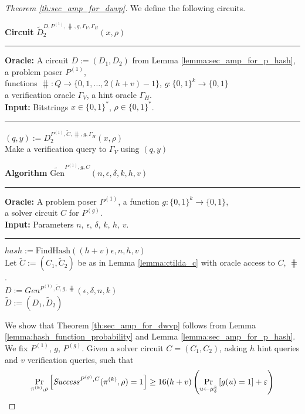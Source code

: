 %
\begin{proof}[Theorem \ref{th:sec_amp_for_dwvp}]
We define the following circuits.
%
\begin{codeblock}
  \textbf{Circuit} $\widetilde{D}_2^{D, P^{(1)}, \hash, g, \Gamma_V, \Gamma_H}(x, \rho)$
  \medskip
  \hrule
  \medskip
  \textbf{Oracle:} A circuit $D :=(D_1, D_2)$ from Lemma \ref{lemma:sec_amp_for_p_hash}, a problem poser $P^{(1)}$, \\
  \IndII functions $\hash: Q \rightarrow \{0,1, \dots, 2(h+v) - 1\}$, $g: \{0,1\}^{k} \rightarrow \{0,1\}$ \\
  \IndII a verification oracle $\Gamma_V$, a hint oracle $\Gamma_H$.\\
  \textbf{Input:}  Bitstrings $x \in \{0,1\}^{*}$, $\rho \in \{0,1\}^{*}$.
  \medskip\hrule\medskip
  $(q, y) := D_2^{P^{(1)}, \widetilde{C}, \hash, g, \Gamma_H}(x, \rho)$ \\
  Make a verification query to $\Gamma_V$ using $(q,y)$
\end{codeblock}
%
%
\begin{codeblock}
  \textbf{Algorithm} $\widetilde{\text{Gen}}^{P^{(1)}, g, C}(n, \epsilon, \delta, k, h, v)$
  \medskip \hrule \medskip
  \textbf{Oracle:} A problem poser $P^{(1)}$, a function $g: \{0,1\}^{k} \rightarrow \{0,1\}$, \\
  \IndII a solver circuit $C$ for $P^{(g)}$.  \\
  \textbf{Input:} Parameters $n$, $\epsilon$, $\delta$, $k$, $h$, $v$.
  \medskip\hrule\medskip
  $hash := \text{FindHash}((h+v)\epsilon, n, h, v)$ \\
  Let $\widetilde{C} := (C_1, \widetilde{C}_2)$ be as in Lemma \ref{lemma:ctilda_c} with oracle access to $C$, $\hash$. \\
  $D := Gen^{P^{(1)},  \widetilde{C},  g, \hash}(\epsilon, \delta, n, k)$ \\
  \Return $\widetilde{D} := (D_1, \widetilde{D}_2)$
\end{codeblock}
%
We show that Theorem \ref{th:sec_amp_for_dwvp} follows from Lemma \ref{lemma:hash_function_probability} and Lemma \ref{lemma:sec_amp_for_p_hash}.
We fix $P^{(1)}$, $g$, $P^{(g)}$. Given a solver circuit $C = (C_1, C_2)$, asking $h$ hint queries and $v$ verification queries, such that
\begin{align*}
    \underset{\pi^{(k)}, \rho}{\Pr}\left[\Success^{P^{(g)}, C}(\pi^{(k)}, \rho) = 1\right] \geq 16(h+v)\left(\underset{u \leftarrow \mu_\delta^k}{\Pr}\left[g(u) = 1\right] + \varepsilon\right)

\end{align*}
\end{proof}
